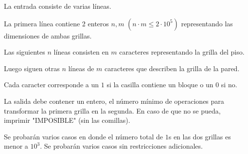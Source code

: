 \documentclass{oci}
\begin{document}
\begin{inputDescription}
La entrada consiste de varias líneas.

La primera línea contiene 2 enteros $n, m$ $(n \cdot m \leq 2 \cdot 10^5)$ representando las dimensiones de ambas grillas.

Las siguientes $n$ líneas consisten en $m$ caracteres representando la grilla del piso.

Luego siguen otras $n$ líneas de $m$ caracteres que describen la grilla de la pared.

Cada caracter corresponde a un $1$ si la casilla contiene un bloque o un $0$ si no.
\end{inputDescription}

\begin{outputDescription}
La salida debe contener un entero, el número mínimo de operaciones para transformar la primera grilla en la segunda. En caso de que no se pueda, imprimir "IMPOSIBLE" (sin las comillas).
\end{outputDescription}

\begin{scoreDescription}
  Se probarán varios casos en donde el número total de $1$s en las dos grillas es menor a $10^3$.
  Se probarán varios casos sin restricciones adicionales.
\end{scoreDescription}

\begin{sampleDescription}
\end{sampleDescription}
\end{document}

